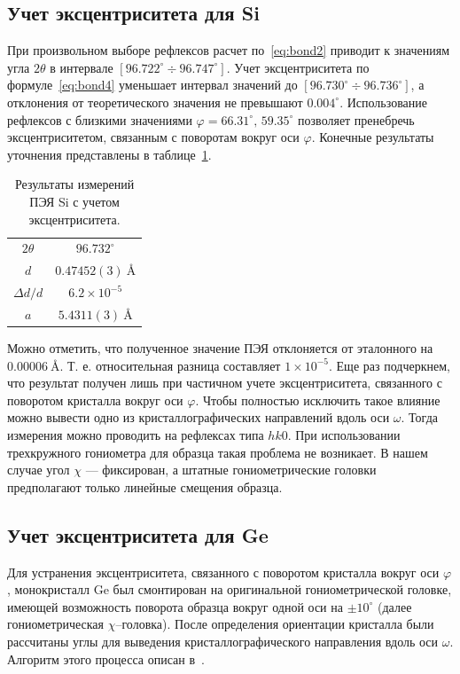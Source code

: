 \documentclass[a4paper,14pt]{extarticle}
\newcommand{\unit}[1]{ \ \text{#1}}
\newcommand{\degree}{^\circ}
\newcommand{\range}[2]{[#1\div#2]}
\newcounter{x}
\begin{document}
\subsection{Учет эксцентриситета для Si}
При произвольном выборе рефлексов расчет по~\ref{eq:bond2} приводит к значениям угла $2\theta$ в интервале $\range{96.722\degree}{96.747\degree}$.
Учет эксцентриситета по формуле~\ref{eq:bond4} уменьшает интервал значений до $\range{96.730\degree}{96.736\degree}$, а отклонения от теоретического значения не превышают $0.004\degree$.
Использование рефлексов с близкими значениями $\varphi = 66.31\degree, \, 59.35\degree$ позволяет пренебречь эксцентриситетом, связанным с поворотам вокруг оси $\varphi$.
Конечные результаты уточнения представлены в таблице~\ref{tab:Si:eccentr}.
\begin{table}[ht!]
    \centering
    \begin{tabular}{ |c|c| }
        \hline
        $2\theta$ & $96.732\degree$ \\
        $d$ & $0.47452 (3)\unit{\AA}$ \\
        $\Delta d / d$ & $6.2 \times 10^{-5}$ \\
        $a$ & $5.4311 (3)\unit{\AA}$ \\
        \hline
    \end{tabular}
    \caption{Результаты измерений ПЭЯ Si с учетом эксцентриситета.}
    \label{tab:Si:eccentr}
\end{table}

Можно отметить, что полученное значение ПЭЯ отклоняется от эталонного на $0.00006\unit{\AA}$.
Т. е. относительная разница составляет $1\times 10^{-5}$.
Еще раз подчеркнем, что результат получен лишь при частичном учете эксцентриситета, связанного с поворотом кристалла вокруг оси $\varphi$.
Чтобы полностью исключить такое влияние можно вывести одно из кристаллографических направлений вдоль оси $\omega$.
Тогда измерения можно проводить на рефлексах типа $hk0$.
При использовании трехкружного гониометра для образца такая проблема не возникает.
В нашем случае угол $\chi$ --- фиксирован, а штатные гониометрические головки предполагают только линейные смещения образца.
\subsection{Учет эксцентриситета для Ge}
Для устранения эксцентриситета, связанного с поворотом кристалла вокруг оси $\varphi$, монокристалл Ge был смонтирован на оригинальной гониометрической головке, имеющей возможность поворота образца вокруг одной оси на $\pm 10\degree$ (далее гониометрическая $\chi$--головка).
После определения ориентации кристалла были рассчитаны углы для выведения кристаллографического направления вдоль оси $\omega$. Алгоритм этого процесса описан в~\cite{Kudryavtsev:2024:eccentr}.
\end{document}
